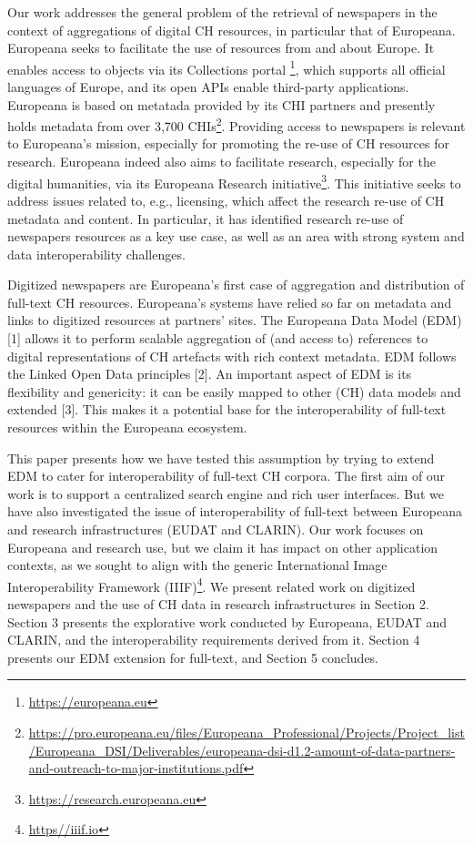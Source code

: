 \documentclass[a4paper,UKenglish,cleveref, autoref]{oasics-v2019}
\begin{document}
Our work addresses the general problem of the retrieval of newspapers in the context of aggregations of digital CH resources, in particular that of Europeana. Europeana seeks to facilitate the use of resources from and about Europe. It enables access to objects via its Collections portal
\footnote{\url{https://europeana.eu}}, which supports all official languages of Europe, and its open APIs enable third-party applications. Europeana is based on metatada provided by its CHI partners and presently holds metadata from over 3,700
CHIs\footnote{\url{https://pro.europeana.eu/files/Europeana_Professional/Projects/Project_list/Europeana_DSI/Deliverables/europeana-dsi-d1.2-amount-of-data-partners-and-outreach-to-major-institutions.pdf}}.
Providing access to newspapers is relevant to Europeana's mission, especially for promoting the re-use of CH resources for research. Europeana indeed also aims to facilitate research, especially for the digital humanities, via its Europeana Research
initiative\footnote{\url{https://research.europeana.eu}}.
This initiative seeks to address issues related to, e.g., licensing, which affect the research re-use of CH metadata and content. In particular, it has identified research re-use of newspapers resources as a key use case, as well as an area with strong system and data interoperability challenges.

Digitized newspapers are Europeana's first case of aggregation and distribution of full-text CH resources. Europeana's systems have relied so far on metadata and links to digitized resources at partners' sites. The Europeana Data Model (EDM) [1] allows it to perform scalable aggregation of (and access to) references to digital representations of CH artefacts with rich context metadata. EDM follows the Linked Open Data principles [2]. An important aspect of EDM is its flexibility and genericity: it can be easily mapped to other (CH) data models and extended [3]. This makes it a potential base for the interoperability of full-text resources within the Europeana ecosystem.

This paper presents how we have tested this assumption by trying to extend EDM to cater for interoperability of full-text CH corpora. The first aim of our work is to support a centralized search engine and rich user interfaces. But we have also investigated the issue of interoperability of full-text between Europeana and research infrastructures (EUDAT and CLARIN). Our work focuses on Europeana and research use, but we claim it has impact on other application contexts, as we sought to align with the generic International Image Interoperability Framework
(IIIF)\footnote{\url{https//iiif.io}}. 
We present related work on digitized newspapers and the use of CH data in research infrastructures in Section 2. Section 3 presents the explorative work conducted by Europeana, EUDAT and CLARIN, and the interoperability requirements derived from it. Section 4 presents our EDM extension for full-text, and Section 5 concludes. 
\end{document}
